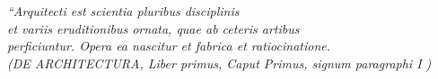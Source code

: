 \begin{epigrafe}
    \vspace*{\fill}
	\begin{flushright}
		\textit{``Arquitecti est scientia pluribus disciplinis \\
    et variis eruditionibus ornata, quae ab ceteris artibus \\
    perficiuntur. Opera ea nascitur et fabrica et ratiocinatione. \\
		(DE ARCHITECTURA, Liber primus, Caput Primus, signum paragraphi I )}
	\end{flushright}
\end{epigrafe}
\newpage

